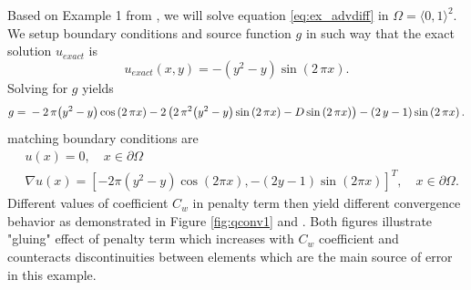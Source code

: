 \begin{example}
\label{ex:quart1}
Based on Example 1 from \cite{Antonietti2013},
we will solve equation \eqref{eq:ex_advdiff} in $\Omega = \langle 0, 1 \rangle^2$.
We setup boundary conditions and source function $g$ in such way that 
the exact solution $u_{exact}$ is
\begin{equation}
	u_{exact}(x,y) =  -{\left(y^{2} - y\right)} \sin\left(2 \, \pi x\right).
\end{equation}
Solving for $g$ yields
\begin{equation}
	g = \\
	 -2 \, \pi {\left(y^{2} - y\right)} \cos\left(2 \, \pi x\right) - 2 \, {\left(2 \, 
	 \pi^{2} 
	{\left(y^{2} - y\right)} \sin\left(2 \, \pi x\right) - D\sin\left(2 \, \pi 
	x\right)\right)} 
	 - {\left(2 \, y - 1\right)} \sin\left(2 \, \pi x\right).
\end{equation}
matching  boundary conditions are
\begin{equation}
	\begin{aligned}
	&u(x) = 0, \quad x \in \partial\Omega\\
	&\nabla u(x) = [-2\pi(y^2 - y)\cos(2 \pi x), -(2 y - 1)\sin(2\pi  x)]^T, \quad x \in 
	\partial\Omega.
	\end{aligned}
\end{equation}
Different values of coefficient $C_w$ in penalty term then yield different 
convergence behavior as demonstrated in Figure \ref{fig:qconv1} and 
. Both figures illustrate "gluing" effect of penalty term 
which increases with $C_w$ coefficient and counteracts discontinuities between elements 
which are the main source of error in this example.


\end{example}
